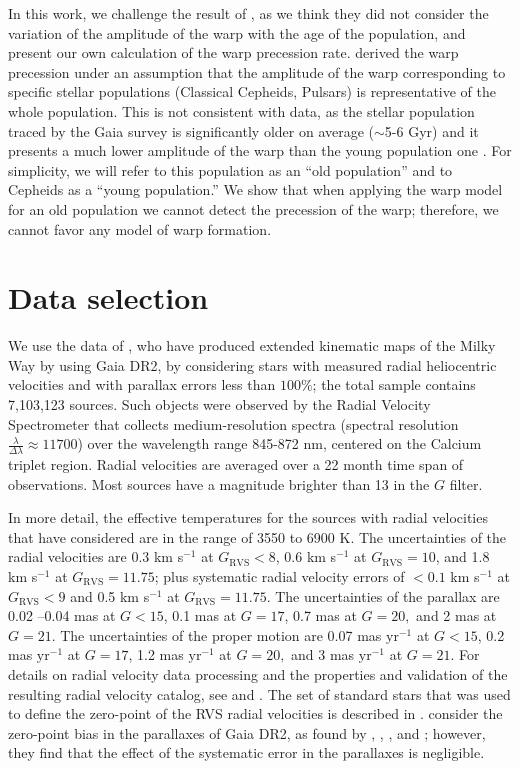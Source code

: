 \documentclass[twocolumn]{aastex63}
\begin{document}
In this work, we challenge the result of , as we think they did not consider the variation of the amplitude of the warp with the age of the population, and present our own calculation of the warp precession rate.  derived the warp precession under an assumption that the amplitude of the warp corresponding to specific stellar populations (Classical Cepheids, Pulsars) is representative of the whole population. This is not consistent with data, as the stellar population traced by the Gaia survey is significantly older on average ($\sim$5-6 Gyr) and it presents a much lower amplitude of the warp than the young population one \citep{zofi,haifeng}. For simplicity, we will refer to this population as an ``old population'' and to Cepheids as a ``young population.'' We show that when applying the warp model for an old population we cannot detect the precession of the warp; therefore, we cannot favor any model of warp formation.
	
\section{Data selection}
We use the data of \citet[hereafter LS19]{martin}, who have produced extended kinematic maps of the Milky Way by using Gaia DR2, by considering stars with measured radial heliocentric velocities and with parallax errors less than $100\%$; the total sample contains 7,103,123 sources. Such objects were observed by the Radial Velocity Spectrometer \citep[RVS;][]{cropper} that collects medium-resolution spectra (spectral resolution $\frac{\lambda}{\Delta \lambda}\approx 11 700$) over the wavelength range 845-872 nm, centered on the Calcium triplet region. Radial velocities are averaged over a 22 month time span of observations. Most sources have a magnitude brighter than 13 in the $G$ filter.

In more detail, the effective temperatures for the sources with radial velocities that  have considered are in the range of 3550 to 6900 K. The uncertainties of the radial velocities are 0.3 km s$^{-1}$ at $G_{\mathrm{RVS}} < 8$, 0.6 km s$^{-1}$ at $G_{\mathrm{RVS}}=10$, and 1.8 km s$^{-1}$ at $G_{\mathrm{RVS}}= 11.75$; plus systematic radial velocity errors of $< 0.1$ km s$^{-1}$ at $G_{\mathrm{RVS}} < 9$ and 0.5 km s$^{-1}$ at $G_{\mathrm{RVS}}= 11.75$. The uncertainties of the parallax are 0.02 –0.04 mas at $G<15$, 0.1 mas at $G=17$, 0.7 mas at $G=20,$ and 2 mas at $G=21$. The uncertainties of the proper motion are 0.07 mas $\mathrm{yr}^{-1}$ at $G<15$, 0.2 mas $\mathrm{yr}^{-1}$ at $G=17$, 1.2 mas $\mathrm{yr}^{-1}$ at $G=20,$ and 3 mas $\mathrm{yr}^{-1}$ at $G=21$. For details on radial velocity data processing and the properties and validation of the resulting radial velocity catalog, see \cite{sartoretti} and \cite{katz}. The set of standard stars that was used to define the zero-point of the RVS radial velocities is described in \cite{soubiran}.  consider the zero-point bias in the parallaxes of Gaia DR2, as found by \cite{lindegren}, \cite{arenou}, \cite{stassun}, and \cite{zinn}; however, they find that the effect of the systematic error in the parallaxes is negligible. 
\end{document}
